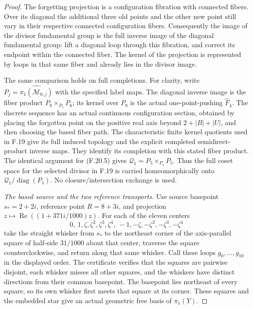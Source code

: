 \begin{proof}
The forgetting projection is a configuration fibration with
connected fibers. Over its diagonal the additional three
old points and the other new point still vary in their
respective connected configuration fibers. Consequently
the image of the divisor fundamental group is the full
inverse image of the diagonal fundamental group: lift a
diagonal loop through this fibration, and correct its
endpoint within the connected fiber. The kernel of the
projection is represented by loops in that same fiber
and already lies in the divisor image.

The same comparison holds on full completions.
For clarity, write $P_j=\widehat{\pi_1(\mathcal M_{0,j})}$
with the specified label maps. The diagonal inverse image
is the fiber product $P_8\times_{P_5}P_6$; its kernel over
$P_8$ is the actual one-point-pushing $\widehat F_4$.
The discrete sequence has an actual continuous
configuration section, obtained by placing the forgotten
point on the positive real axis beyond
$2+|B|+|U|$, and then choosing the based fiber path.
The characteristic finite kernel quotients used in F.19
give its full induced topology and the explicit completed
semidirect-product inverse maps. They identify its
completion with this stated fiber product.
The identical argument for (F.20.5) gives
$\mathcal Q_1=P_5\times_{P_4}P_5$.
Thus the full coset space for the selected divisor in
F.19 is carried homeomorphically onto
$\mathcal Q_1/\operatorname{diag}(P_5)$.
No closure/intersection exchange is used.

\emph{The based source and the two reference transports.}
Use source basepoint $s_*=2+2i$, reference point $R=8+3i$,
and projection $z\mapsto\operatorname{Re}((1+371i/1000)z)$.
For each of the eleven centers
\[
       0,\ 1,\zeta,\zeta^2,\zeta^3,\zeta^4,\
          -1,-\zeta,-\zeta^2,-\zeta^3,-\zeta^4
                                                               \tag{F.20.6}
\]
take the straight whisker from $s_*$ to the northeast
corner of the axis-parallel square of half-side
$31/1000$ about that center, traverse the square
counterclockwise, and return along that same whisker.
Call these loops $g_0,\ldots,g_{10}$ in the displayed order.
The certificate verifies that the squares are pairwise
disjoint, each whisker misses all other squares, and
the whiskers have distinct directions from their common
basepoint. The basepoint lies northeast of every square,
so its own whisker first meets that square at its corner.
These squares and the embedded star give an actual
geometric free basis of $\pi_1(Y)$.


\end{proof}
